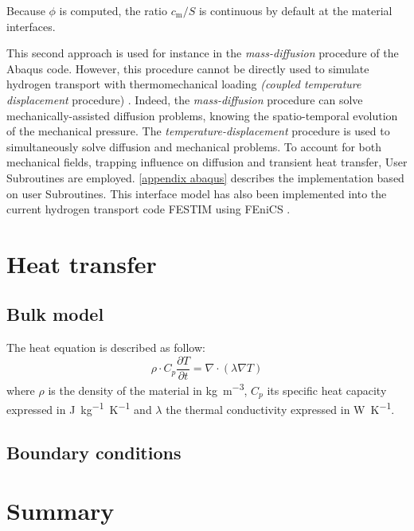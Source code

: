 Because $\phi$ is computed, the ratio $c_\mathrm{m}/S$ is continuous by default at the material interfaces.

This second approach is used for instance in the \textit{mass-diffusion} procedure of the Abaqus code.
However, this procedure cannot be directly used to simulate hydrogen transport with thermomechanical loading \textit{(coupled temperature displacement} procedure) .
Indeed, the \textit{mass-diffusion} procedure can solve mechanically-assisted diffusion problems, knowing the spatio-temporal evolution of the mechanical pressure.
The \textit{temperature-displacement} procedure is used to simultaneously solve diffusion and mechanical problems.
To account for both mechanical fields, trapping influence on diffusion and transient heat transfer, User Subroutines are employed.
\ref{appendix abaqus} describes the implementation based on user Subroutines.
This interface model has also been implemented into the current hydrogen transport code FESTIM  using FEniCS .


\section{Heat transfer}
\subsection{Bulk model}

The heat equation is described as follow:
\begin{equation}
    \rho \cdot C_p \frac{\partial T}{\partial t}=\nabla \cdot (\lambda \nabla T)
    \label{eq:heat equation}
\end{equation}
where $\rho$ is the density of the material in \si{kg.m^{-3}}, $C_p$ its specific heat capacity expressed in \si{J.kg^{-1}.K^{-1}} and $\lambda$ the thermal conductivity expressed in \si{W.K^{-1}}.

\subsection{Boundary conditions}
\section{Summary}